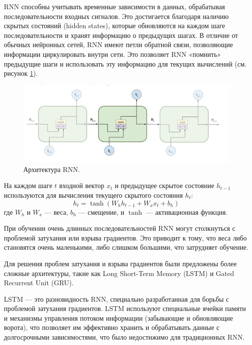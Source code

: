 \documentclass[a4paper,12pt]{extarticle}
\begin{document}
RNN способны учитывать временные зависимости в данных, обрабатывая последовательности входных сигналов. Это достигается благодаря наличию скрытых состояний (hidden states), которые обновляются на каждом шаге последовательности и хранят информацию о предыдущих шагах. В отличие от обычных нейронных сетей, RNN имеют петли обратной связи, позволяющие информации циркулировать внутри сети. Это позволяет RNN «помнить» предыдущие шаги и использовать эту информацию для текущих вычислений (см. рисунок \ref{fig:rnn_arch}).

\begin{figure}[ht]
	\centering
	\includegraphics[scale=0.3]{rnn_arch.png}
	\caption{Архитектура RNN.}
	\label{fig:rnn_arch}
\end{figure}

На каждом шаге \( t \) входной вектор \( x_t \) и предыдущее скрытое состояние \( h_{t-1} \) используются для вычисления текущего скрытого состояния \( h_t \):
\begin{equation}
	\label{rnn_hidden_layer}
	h_t = \tanh(W_h h_{t-1} + W_x x_t + b_h)
\end{equation}
где \( W_h \) и \( W_x \) — веса, \( b_h \) — смещение, и \( \tanh \) — активационная функция.

При обучении очень длинных последовательностей RNN могут столкнуться с проблемой затухания или взрыва градиентов. Это приводит к тому, что веса либо становятся очень маленькими, либо слишком большими, что затрудняет обучение. 

Для решения проблем затухания и взрыва градиентов были предложены более сложные архитектуры, такие как Long Short-Term Memory (LSTM) и Gated Recurrent Unit (GRU).

LSTM — это разновидность RNN, специально разработанная для борьбы с проблемой затухания градиентов. LSTM используют специальные ячейки памяти и механизмы управления потоком информации (забывающие и обновляющие ворота), что позволяет им эффективно хранить и обрабатывать данные с долгосрочными зависимостями, что было недостижимо для традиционных RNN.
\end{document}
